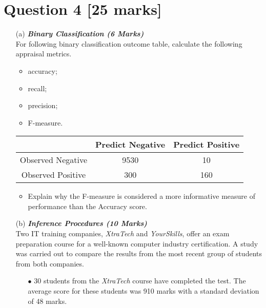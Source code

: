 



\newpage
\section*{Question 4 [25 marks]}

\begin{itemize}
\item[(a)] \textbf{\textit{Binary Classification (6 Marks)}}\\
For following binary classification outcome table, calculate the following appraisal metrics.
\begin{itemize}	
\item 	accuracy;
\item 	recall;
\item 	precision;
\item  	F-measure.
\end{itemize}	

\begin{center}
\begin{tabular}{|c|c|c|}
\hline  & \phantom{spa}Predict Negative\phantom{spa} & \phantom{spa}Predict Positive\phantom{spa} \\ 
\hline\phantom{spa} Observed Negative \phantom{spa}&	9530	&	10	\\ 
\hline \phantom{spa}Observed Positive\phantom{spa} & 	300	&	160	\\ 
\hline 
\end{tabular} 
\end{center}

\begin{itemize}	
\item   Explain why the F-measure is considered a more informative measure of performance than the Accuracy score.

\end{itemize}
\item[(b)] \textbf{\textit{Inference Procedures (10 Marks)}}\\
Two IT training companies, \textit{XtraTech} and \textit{YourSkills}, offer an exam preparation course for a well-known computer industry certification. A study was carried out to compare the results from the most recent group of students from both companies.
\begin{itemize}
\item[$\bullet$]30 students from the \textit{XtraTech} course have completed the test. The average score for these students was 910 marks with a standard deviation of 48 marks.


\end{itemize}
\end{itemize}
